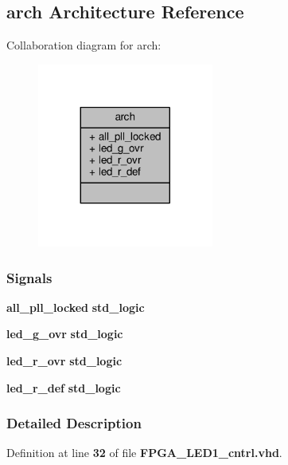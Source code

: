 \subsection{arch Architecture Reference}
\label{classFPGA__LED1__cntrl_1_1arch}


Collaboration diagram for arch\+:\nopagebreak
\begin{figure}[H]
\begin{center}
\leavevmode
\includegraphics[width=164pt]{dd/d56/classFPGA__LED1__cntrl_1_1arch__coll__graph}
\end{center}
\end{figure}
\subsubsection*{Signals}
 \begin{DoxyCompactItemize}
\item 
{\bf all\+\_\+pll\+\_\+locked} {\bfseries \textcolor{comment}{std\+\_\+logic}\textcolor{vhdlchar}{ }} 
\item 
{\bf led\+\_\+g\+\_\+ovr} {\bfseries \textcolor{comment}{std\+\_\+logic}\textcolor{vhdlchar}{ }} 
\item 
{\bf led\+\_\+r\+\_\+ovr} {\bfseries \textcolor{comment}{std\+\_\+logic}\textcolor{vhdlchar}{ }} 
\item 
{\bf led\+\_\+r\+\_\+def} {\bfseries \textcolor{comment}{std\+\_\+logic}\textcolor{vhdlchar}{ }} 
\end{DoxyCompactItemize}


\subsubsection{Detailed Description}


Definition at line {\bf 32} of file {\bf F\+P\+G\+A\+\_\+\+L\+E\+D1\+\_\+cntrl.\+vhd}.



